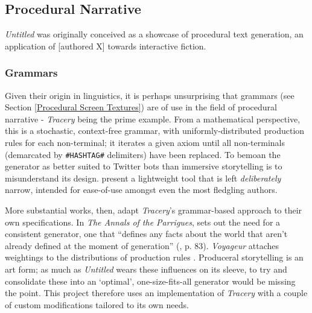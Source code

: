 \documentclass[a4paper, 11pt]{article}
\begin{document}
\begin{flushleft}
\vspace{5pt}

\vspace{5pt}

\subsection{Procedural Narrative} %

\textit{Untitled} was originally conceived as a showcase of procedural text generation, an application of [authored X] towards interactive fiction. 

\subsubsection{Grammars}

Given their origin in linguistics, it is perhaps unsurprising that grammars (see Section \ref{Procedural Screen Textures}) are of use in the field of procedural narrative - \textit{Tracery} \citep{comptonTracery} being the prime example. From a mathematical perspective, this is a stochastic, context-free grammar, with uniformly-distributed production rules for each non-terminal; it iterates a given axiom until all non-terminals (demarcated by \texttt{\#HASHTAG\#} delimiters) have been replaced. To bemoan the generator as better suited to Twitter bots than immersive storytelling is to misunderstand its design. \citeauthor{comptonTracery} present a lightweight tool that is left \textit{deliberately} narrow, intended for ease-of-use amongst even the most fledgling authors.

\vspace{5pt}\noindent
More substantial works, then, adapt \textit{Tracery}'s grammar-based approach to their own specifications. In \textit{The Annals of the Parrigues}, \citeauthor{shortParrigues} sets out the need for a consistent generator, one that ``defines any facts about the world that aren’t already defined at the moment of generation'' (\citeyear{shortParrigues}, p. 83). \textit{Voyageur} \citep{diasVoyageur} attaches weightings to the distributions of production rules \citep{diasVoyageurDescriptions}. Produceral storytelling is an art form; as much as \textit{Untitled} wears these influences on its sleeve, to try and consolidate these into an `optimal', one-size-fits-all generator would be missing the point. This project therefore uses an implementation of \textit{Tracery} with a couple of custom modifications tailored to its own needs.


\end{flushleft}
\end{document}
